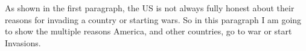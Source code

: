 As shown in the first paragraph, the US is not always fully honest about their reasons for invading a country or starting wars. So in this paragraph I am going to show the multiple reasons America, and other countries, go to war or start Invasions.


